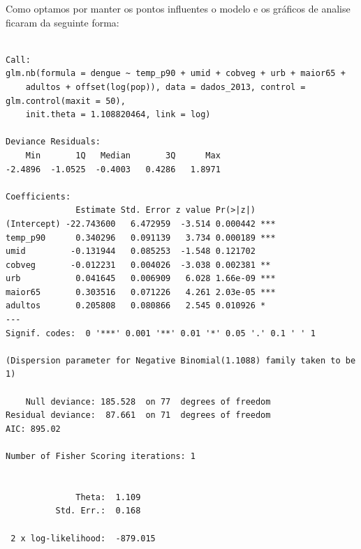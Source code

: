 \documentclass[12pt,a4paper]{article}\usepackage[]{graphicx}\usepackage[]{color}
\makeatletter
\newenvironment{kframe}{%
 \def\at@end@of@kframe{}%
 \ifinner\ifhmode%
  \def\at@end@of@kframe{\end{minipage}}%
  \begin{minipage}{\columnwidth}%
 \fi\fi%
 \def\FrameCommand##1{\hskip\@totalleftmargin \hskip-\fboxsep
 \colorbox{shadecolor}{##1}\hskip-\fboxsep
     \hskip-\linewidth \hskip-\@totalleftmargin \hskip\columnwidth}%
 \MakeFramed {\advance\hsize-\width
   \@totalleftmargin\z@ \linewidth\hsize
   \@setminipage}}%
 {\par\unskip\endMakeFramed%
 \at@end@of@kframe}
\newenvironment{knitrout}{}{} %
\makeatother
\begin{document}
Como optamos por manter os pontos influentes o modelo e os gráficos de analise ficaram da seguinte forma:




\begin{knitrout}
\color{fgcolor}\begin{kframe}
\begin{verbatim}

Call:
glm.nb(formula = dengue ~ temp_p90 + umid + cobveg + urb + maior65 + 
    adultos + offset(log(pop)), data = dados_2013, control = glm.control(maxit = 50), 
    init.theta = 1.108820464, link = log)

Deviance Residuals: 
    Min       1Q   Median       3Q      Max  
-2.4896  -1.0525  -0.4003   0.4286   1.8971  

Coefficients:
              Estimate Std. Error z value Pr(>|z|)    
(Intercept) -22.743600   6.472959  -3.514 0.000442 ***
temp_p90      0.340296   0.091139   3.734 0.000189 ***
umid         -0.131944   0.085253  -1.548 0.121702    
cobveg       -0.012231   0.004026  -3.038 0.002381 ** 
urb           0.041645   0.006909   6.028 1.66e-09 ***
maior65       0.303516   0.071226   4.261 2.03e-05 ***
adultos       0.205808   0.080866   2.545 0.010926 *  
---
Signif. codes:  0 '***' 0.001 '**' 0.01 '*' 0.05 '.' 0.1 ' ' 1

(Dispersion parameter for Negative Binomial(1.1088) family taken to be 1)

    Null deviance: 185.528  on 77  degrees of freedom
Residual deviance:  87.661  on 71  degrees of freedom
AIC: 895.02

Number of Fisher Scoring iterations: 1


              Theta:  1.109 
          Std. Err.:  0.168 

 2 x log-likelihood:  -879.015 
\end{verbatim}
\end{kframe}
\end{knitrout}
\end{document}
